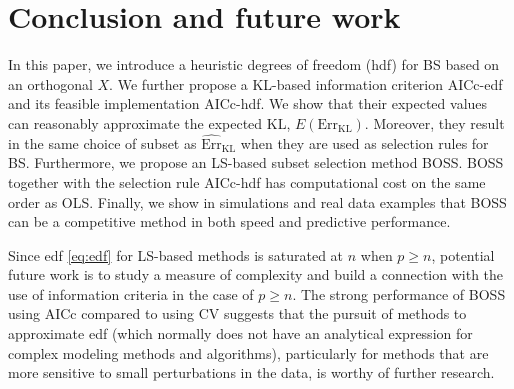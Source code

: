 \section{Conclusion and future work}
\label{sec:conclusion}
In this paper, we introduce a heuristic degrees of freedom (hdf) for BS based on an orthogonal $X$. We further propose a KL-based information criterion AICc-edf and its feasible implementation AICc-hdf. We show that their expected values can reasonably approximate the expected KL, $E(\text{Err}_\text{KL})$. Moreover, they result in the same choice of subset as $\widehat{\text{Err}}_{\text{KL}}$  when they are used as selection rules for BS. Furthermore, we propose an LS-based subset selection method BOSS. BOSS together with the selection rule AICc-hdf has computational cost on the same order as OLS. Finally, we show in simulations and real data examples that BOSS can be a competitive method in both speed and predictive performance. 

Since edf \eqref{eq:edf} for LS-based methods is saturated at $n$ when $p\ge n$, potential future work is to study a measure of complexity and build a connection with the use of information criteria in the case of $p \ge n$. The strong performance of BOSS using AICc compared to using CV suggests that the pursuit of methods to approximate edf (which normally does not have an analytical expression for complex modeling methods and algorithms), particularly for methods that are more sensitive to small perturbations in the data, is worthy of further research.